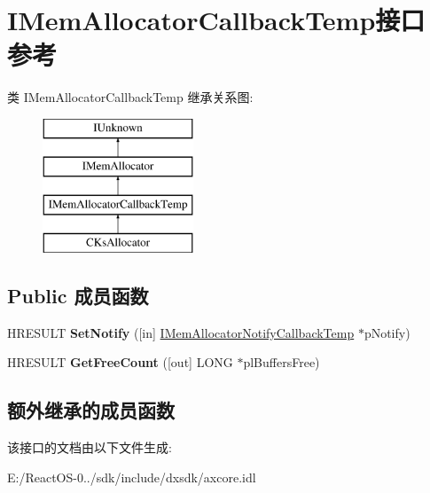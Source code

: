 \hypertarget{interface_i_mem_allocator_callback_temp}{}\section{I\+Mem\+Allocator\+Callback\+Temp接口 参考}
\label{interface_i_mem_allocator_callback_temp}
类 I\+Mem\+Allocator\+Callback\+Temp 继承关系图\+:\begin{figure}[H]
\begin{center}
\leavevmode
\includegraphics[height=4.000000cm]{interface_i_mem_allocator_callback_temp}
\end{center}
\end{figure}
\subsection*{Public 成员函数}
\begin{DoxyCompactItemize}
\item 
\mbox{\label{interface_i_mem_allocator_callback_temp_a2317d85bc408b654aadf0d38f8272f7e}} 
H\+R\+E\+S\+U\+LT {\bfseries Set\+Notify} (\mbox{[}in\mbox{]} \hyperlink{interface_i_mem_allocator_notify_callback_temp}{I\+Mem\+Allocator\+Notify\+Callback\+Temp} $\ast$p\+Notify)
\item 
\mbox{\label{interface_i_mem_allocator_callback_temp_a7bd040416fb046f7c0a57fcfedf8af5d}} 
H\+R\+E\+S\+U\+LT {\bfseries Get\+Free\+Count} (\mbox{[}out\mbox{]} L\+O\+NG $\ast$pl\+Buffers\+Free)
\end{DoxyCompactItemize}
\subsection*{额外继承的成员函数}


该接口的文档由以下文件生成\+:\begin{DoxyCompactItemize}
\item 
E\+:/\+React\+O\+S-\/0../sdk/include/dxsdk/axcore.\+idl\end{DoxyCompactItemize}
